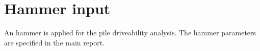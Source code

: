 




\chapter{Hammer input}\label{sec_1}

An hammer is applied for the pile driveability analysis. The hammer parameters are specified in the main report.


